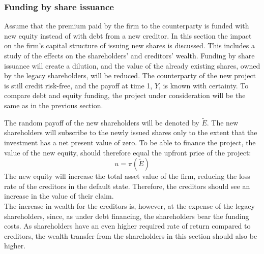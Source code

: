 \documentclass[main.tex]{subfiles}
\begin{document}
    \subsubsection{Funding by share issuance}
    \label{sec:example-equity-issuance}
        Assume that the premium paid by the firm to the counterparty is funded with new equity instead of with debt from a new creditor. 
        In this section the impact on the firm's capital structure of issuing new shares is discussed.
        This includes a study of the effects on the shareholders' and creditors' wealth. 
        Funding by share issuance will create a dilution, and the value of the already existing shares, owned by the legacy shareholders, will be reduced. 
        The counterparty of the new project is still credit risk-free, 
        and the payoff at time 1, $Y$, is known with certainty. 
        To compare debt and equity funding, 
        the project under consideration will be the same as in the previous section.

        The random payoff of the new shareholders will be denoted by $\tilde{E}$.
        The new shareholders will subscribe to the newly issued shares 
        only to the extent that the investment has a net present value of zero.
        To be able to finance the project, the value of the new equity,
        should therefore equal the upfront price of the project:
        \begin{equation}\label{eqn:derivative-zero-npv}
            u = \pi(\tilde{E})
        \end{equation}
        The new equity will increase the total asset value of the firm,
        reducing the loss rate of the creditors in the default state.
        Therefore, the creditors should see an increase in the value of their claim.\\
        The increase in wealth for the creditors is, however, at the expense of the legacy shareholders,
        since, as under debt financing, the shareholders bear the funding costs.
        As shareholders have an even higher required rate of return compared to creditors,
        the wealth transfer from the shareholders in this section should also be higher.
\end{document}
